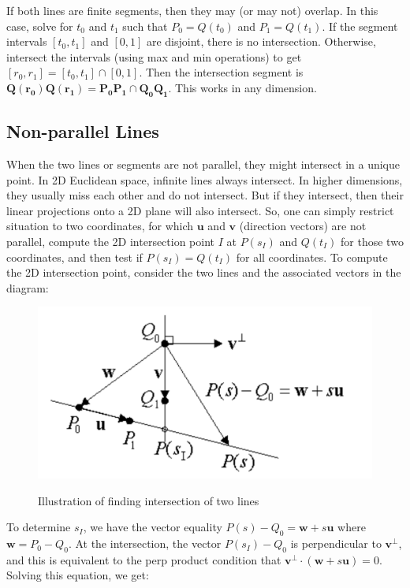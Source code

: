 \documentclass[12pt]{article}
\begin{document}
If both lines are finite segments, then they may (or may not) 
overlap. In this case, solve for $t_0$ and $t_1$ such that $P_0 = Q(t_0)$ 
and $P_1 = Q(t_1)$. If the segment intervals $[t_0,t_1]$ and $[0,1]$ are 
disjoint, there is no intersection. Otherwise, intersect the 
intervals (using max and min operations) to get 
$[r_0,r_1]=[t_0,t_1] \cap [0,1]$. Then the intersection segment is 
$\pmb{Q(r_0)Q(r_1)}=\pmb{P_0P_1} \cap \pmb{Q_0Q_1}$. This works in any dimension.

\subsection{Non-parallel Lines}
When the two lines or segments are not parallel, they might 
intersect in a unique point. In 2D Euclidean space, infinite 
lines always intersect. In higher dimensions, they usually miss 
each other and do not intersect. But if they intersect, then 
their linear projections onto a 2D plane will also intersect. 
So, one can simply restrict situation to two coordinates, for which $\pmb{u}$ and $\pmb{v}$ (direction vectors)
are not parallel, compute the 2D intersection point $I$ at $P(s_I)$
and $Q(t_I)$ for those two coordinates, and then test if 
$P(s_I) = Q(t_I)$ for all coordinates. To compute the 2D 
intersection point, consider the two lines and the associated 
vectors in the diagram:

\begin{center}
  \begin{figure}[!htb]
    \centering
    \includegraphics[width=.5\linewidth]{figures/fig18.png}
    \label{fig:10}
    \caption{Illustration of finding intersection of two lines}
  \end{figure}
\end{center}

To determine $s_I$, we have the vector equality $P(s)-Q_0=\pmb{w}+s\pmb{u}$ where 
$\pmb{w}=P_0-Q_0$. At the intersection, the vector $P(s_I)-Q_0$ is perpendicular 
to $\pmb{v}^\perp$, and this is equivalent to the perp product condition 
that $\pmb{v}^\perp \cdot (\pmb{w}+s\pmb{u})=0$. Solving this equation, we get:
\end{document}
